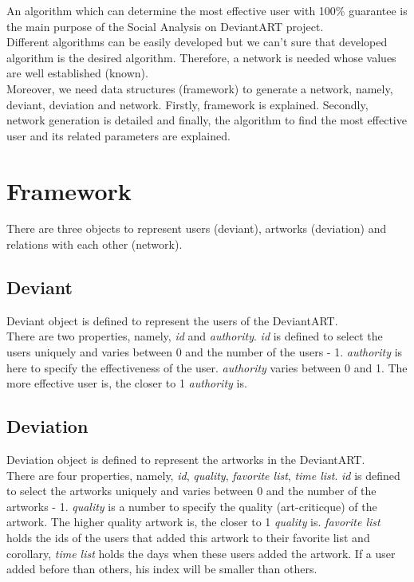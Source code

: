 \documentclass[12pt,a4paper]{report}
\begin{document}
	\hspace{0.6cm}An algorithm which can determine the most effective user with 100\% guarantee is the main purpose of  the Social Analysis on DeviantART project. \\	
	
	Different algorithms can be easily developed but we can't sure that developed algorithm is the desired algorithm. Therefore, a network is needed whose values are well established (known). \\

	Moreover, we need data structures (framework) to generate a network, namely, deviant, deviation and network. Firstly, framework is explained. Secondly, network generation is detailed and finally, the algorithm to find the most effective user and its related parameters are explained. 


\chapter{Framework} 

	\hspace{0.6cm}There are three objects to represent users (deviant), artworks (deviation) and relations with each other (network). 

\section{Deviant}

	\hspace{0.6cm}Deviant object is defined to represent the users of the DeviantART.  \\
	
	There are two properties, namely, \emph{id} and \emph{authority}. \emph{id} is defined to select the users uniquely and varies between 0 and the number of the users - 1. \emph{authority} is here to specify the effectiveness of the user. \emph{authority} varies between 0 and 1. The more effective user is, the closer to 1 \emph{authority} is. 	

\section{Deviation}

	\hspace{0.6cm}Deviation object is defined to represent the artworks in the DeviantART. \\

	There are four properties, namely, \emph{id}, \emph{quality}, \emph{favorite list}, \emph{time list}. \emph{id} is defined to select the artworks uniquely and varies between 0 and the number of the artworks - 1. \emph{quality} is a number to specify the quality (art-criticque) of the artwork. The higher quality artwork is, the closer to 1 \emph{quality} is. \emph{favorite list} holds the ids of the users that added this artwork to their favorite list and corollary, \emph{time list} holds the days when these users added the artwork. If a user added before than others, his index will be smaller than others.
\end{document}
